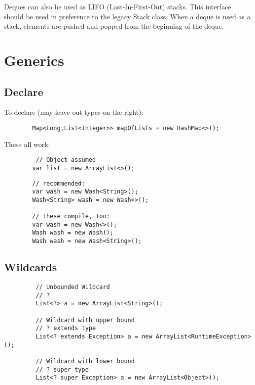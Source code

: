\documentclass{scrartcl}
\begin{document}
    Deques can also be used as LIFO (Last-In-First-Out) stacks. This interface should be used in preference to the legacy Stack class. When a deque is used as a stack, elements are pushed and popped from the beginning of the deque.


\section{Generics}
\subsection{Declare}

     To declare (may leave out types on the right):

    \begin{lstlisting}
        Map<Long,List<Integer>> mapOfLists = new HashMap<>();
    \end{lstlisting}

    These all work:

    \begin{lstlisting}
         // Object assumed
        var list = new ArrayList<>();
    \end{lstlisting}

    \begin{lstlisting}
        // recommended:
        var wash = new Wash<String>();
        Wash<String> wash = new Wash<>();

        // these compile, too:
        var wash = new Wash<>();
        Wash wash = new Wash();
        Wash wash = new Wash<String>();

    \end{lstlisting}



\subsection{Wildcards}

    \begin{lstlisting}
         // Unbounded Wildcard
         //	?
         List<?> a = new ArrayList<String>();

         // Wildcard with upper bound
         // ? extends type
         List<? extends Exception> a = new ArrayList<RuntimeException>();

         // Wildcard with lower bound
         //	? super type
         List<? super Exception> a = new ArrayList<Object>();
    \end{lstlisting}
\end{document}
